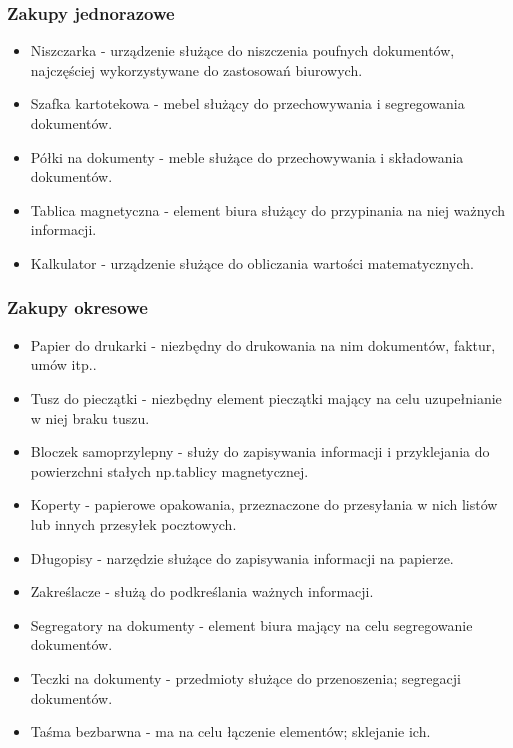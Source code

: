 			\subsubsection{Zakupy jednorazowe}
					\begin{itemize}
						\item Niszczarka - urządzenie służące do niszczenia poufnych dokumentów, najczęściej wykorzystywane do zastosowań biurowych. 
						\item Szafka kartotekowa - mebel służący do przechowywania i segregowania dokumentów. 
						\item Półki na dokumenty - meble służące do przechowywania i składowania dokumentów. 
						\item Tablica magnetyczna - element biura służący do przypinania na niej ważnych informacji.
						\item Kalkulator - urządzenie służące do obliczania wartości matematycznych. 
					\end{itemize}	
						
			\subsubsection{Zakupy okresowe}
					\begin{itemize}
						\item Papier do drukarki - niezbędny do drukowania na nim dokumentów, faktur, umów itp..
						\item Tusz do pieczątki - niezbędny element pieczątki mający na celu uzupełnianie w niej braku tuszu. 
						\item Bloczek samoprzylepny - służy do zapisywania informacji i przyklejania do powierzchni  stałych np.tablicy magnetycznej. 
						\item Koperty - papierowe opakowania, przeznaczone do przesyłania w nich listów lub innych przesyłek pocztowych.
						\item Długopisy - narzędzie służące do zapisywania informacji na papierze. 
						\item Zakreślacze - służą do podkreślania ważnych informacji. 
						\item Segregatory na dokumenty - element biura mający na celu segregowanie dokumentów. 
						\item Teczki na dokumenty - przedmioty służące do przenoszenia; segregacji dokumentów. 
						\item Taśma bezbarwna - ma na celu łączenie elementów; sklejanie ich. 
						
					\end{itemize}	

					
